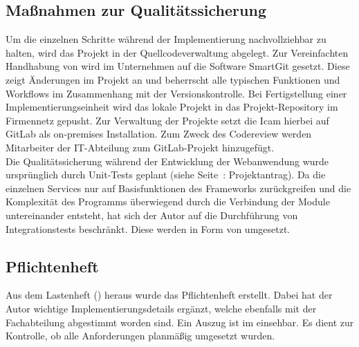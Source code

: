 \subsection{Maßnahmen zur Qualitätssicherung}
\label{sec:Qualitaetssicherung}
Um die einzelnen Schritte während der Implementierung nachvollziehbar zu halten,
wird das Projekt in der Quellcodeverwaltung  abgelegt.
Zur Vereinfachten Handhabung von  wird im Unternehmen auf die Software SmartGit gesetzt. 
Diese zeigt Änderungen im Projekt an und beherrscht alle typischen Funktionen und Workflows im Zusammenhang
mit der Versionskontrolle. Bei Fertigstellung einer Implementierungseinheit wird das lokale Projekt in das 
Projekt-Repository im Firmennetz gepusht. Zur Verwaltung der Projekte setzt die \acs{Icam} hierbei auf GitLab als on-premises Installation. 
Zum Zweck des Codereview werden Mitarbeiter der IT-Abteilung zum GitLab-Projekt hinzugefügt.\\
Die Qualitätssicherung während der Entwicklung der Webanwendung wurde ursprünglich durch Unit-Tests geplant
(siehe Seite~\pageref{Projektantrag}: Projektantrag).
Da die einzelnen Services nur auf Basisfunktionen des Frameworks zurückgreifen und die Komplexität des Programms 
überwiegend durch die Verbindung der Module untereinander entsteht, hat sich der Autor auf die Durchführung von
Integrationstests beschränkt. Diese werden in Form von  umgesetzt.

\subsection{Pflichtenheft}
\label{sec:Pflichtenheft}
Aus dem Lastenheft () heraus wurde das Pflichtenheft erstellt. 
Dabei hat der Autor wichtige Implementierungsdetails ergänzt, welche ebenfalls mit der Fachabteilung abgestimmt worden sind.
Ein Auszug ist im  einsehbar. Es dient zur Kontrolle, ob alle Anforderungen planmäßig
umgesetzt wurden.
\clearpage